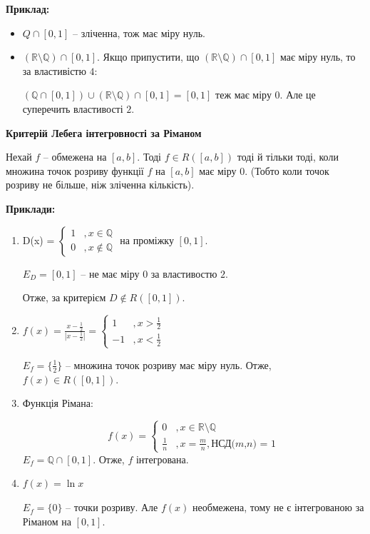 \documentclass[12pt]{report}
\begin{document}
	\textbf{Приклад:}
	
	\begin{itemize}
		
		\item $Q \cap [0,1]$ -- зліченна, тож має міру нуль.
		\item $(\mathbb{R} \setminus \mathbb{Q}) \cap [0,1]$. Якщо припустити, що $(\mathbb{R} \setminus \mathbb{Q}) \cap [0,1]$ 
		має міру нуль, то за властивістю $4$:
		
		$(\mathbb{Q}\cap[0,1]) \cup (\mathbb{R} \setminus \mathbb{Q}) \cap [0,1] = [0,1]$ теж має міру 0. Але це суперечить властивості $2$.
		
	\end{itemize}
	
	
	\textbf{Критерій Лебега інтегровності за Ріманом}
	
	Нехай $f$ -- обмежена на $[a,b]$. Тоді $f \in R([a,b])$ тоді й тільки тоді, коли множина точок розриву функції $f$ на $[a,b]$ має міру $0$.
	(Тобто коли точок розриву не більше, ніж зліченна кількість).
	
	\textbf{Приклади:}
	
	\begin{enumerate}
		\item D(x) = $\begin{cases} 1 &, x \in \mathbb{Q} \\ 0 &, x \notin \mathbb{Q} \end{cases}$ на проміжку $[0,1]$.
		
		$E_{D} = [0,1]$ -- не має міру $0$ за властивостю $2$.
		
		Отже, за критерієм $D \notin R([0,1])$.
		
		\item $f(x) = \frac{x - \frac{1}{2}}{|x - \frac{1}{2}|} = \begin{cases} 1 &, x > \frac{1}{2} \\ -1 &, x < \frac{1}{2} \end{cases}$
		
		$E_f = \{\frac{1}{2}\}$ -- множина точок розриву має міру нуль. Отже, $f(x) \in R([0,1])$.
		
		\item Функція Рімана:
		
		$$f(x) = \begin{cases} 0 &, x \in \mathbb{R} \setminus \mathbb{Q} \\ 
		\frac{1}{n} &, x = \frac{m}{n}, \textrm{НСД($m$,$n$) = 1}
		\end{cases}$$
		$E_f = \mathbb{Q} \cap [0,1]$. Отже, $f$ інтегрована.
		
		\item $f(x) = \ln x$
		
		$E_f = \{0\}$ -- точки розриву. Але $f(x)$ необмежена, тому не є інтегрованою за Ріманом на $[0,1]$.
		
	\end{enumerate}
\end{document}
